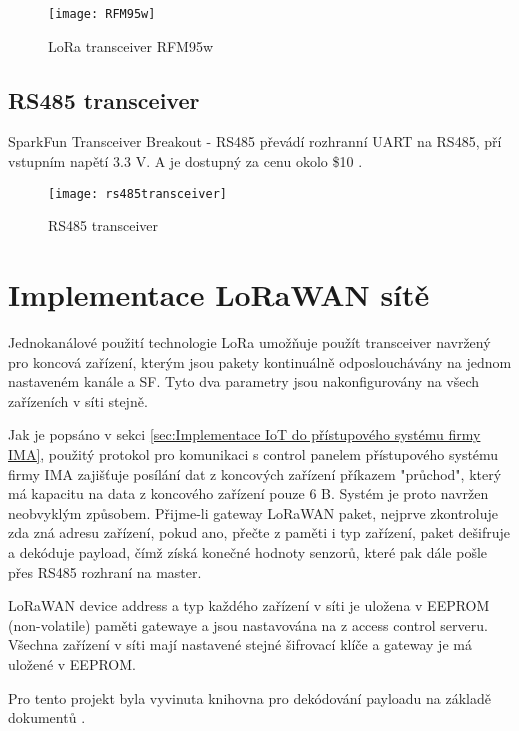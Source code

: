 \begin{figure}[!h]
    \centering
    \texttt{[image: RFM95w]}
    \caption{LoRa transceiver RFM95w \cite{RFM95w}}
    \label{fig:02}
\end{figure}

\subsection{RS485 transceiver}
SparkFun Transceiver Breakout - RS485 převádí rozhranní UART na RS485, pří vstupním napětí 3.3 V. A je dostupný za cenu okolo \$10 \cite{rs485tr}.

\begin{figure}[!h]
    \centering
    \texttt{[image: rs485transceiver]}
    \caption{RS485 transceiver \cite{rs485tr}}
    \label{fig:rs485transceiver}
\end{figure}

\newpage
\section{Implementace LoRaWAN sítě}
Jednokanálové použití technologie LoRa umožňuje použít transceiver navržený pro koncová zařízení, 
kterým jsou pakety kontinuálně odposlouchávány na jednom nastaveném kanále a SF. 
Tyto dva parametry jsou nakonfigurovány na všech zařízeních v síti stejně.

Jak je popsáno v sekci \ref{sec:Implementace IoT do přístupového systému firmy IMA}, 
použitý protokol pro komunikaci s control panelem přístupového systému firmy IMA zajišťuje posílání dat z koncových zařízení příkazem "průchod", 
který má kapacitu na data z koncového zařízení pouze 6 B. 
Systém je proto navržen neobvyklým způsobem. 
Přijme-li gateway LoRaWAN paket, nejprve zkontroluje zda zná adresu zařízení, pokud ano, přečte z paměti i typ zařízení,
 paket dešifruje a dekóduje payload, čímž získá konečné hodnoty senzorů, které pak dále pošle přes RS485 rozhraní na master.

LoRaWAN device address a typ každého zařízení v síti je uložena v EEPROM (non-volatile) paměti gatewaye a jsou nastavována na z access control serveru.
Všechna zařízení v síti mají nastavené stejné šifrovací klíče a gateway je má uložené v EEPROM.

Pro tento projekt byla vyvinuta knihovna pro dekódování payloadu na základě dokumentů \cite{lwSpec} \cite{lwSecur}.


